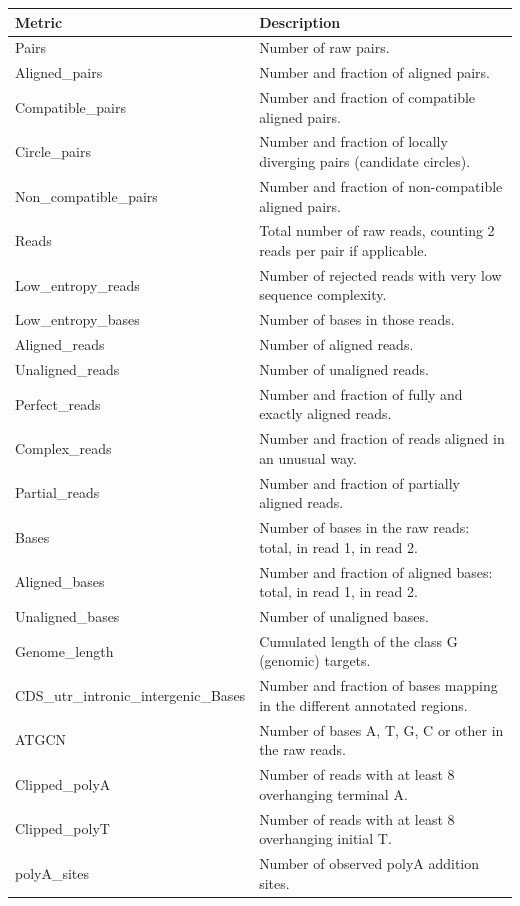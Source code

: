 \documentclass[11pt]{article}
\begin{document}
\begin{center}
\begin{longtable}{p{4.5cm} p{9cm}}
\toprule
\textbf{Metric} & \textbf{Description} \\
\midrule
\endhead
Pairs  & Number of raw pairs. \\
Aligned\_pairs & Number and fraction of aligned pairs. \\
Compatible\_pairs & Number and fraction of compatible aligned pairs. \\
Circle\_pairs & Number and fraction of locally diverging pairs (candidate circles). \\
Non\_compatible\_pairs  & Number and fraction of non-compatible aligned pairs. \\
Reads & Total number of raw reads, counting 2 reads per pair if applicable. \\
Low\_entropy\_reads & Number of rejected reads with very low sequence complexity. \\
Low\_entropy\_bases & Number of bases in those reads. \\
Aligned\_reads & Number of aligned reads. \\
Unaligned\_reads & Number of unaligned reads. \\
Perfect\_reads & Number and fraction of fully and exactly aligned reads. \\
Complex\_reads & Number and fraction of reads aligned in an unusual way. \\
Partial\_reads & Number and fraction of partially aligned reads. \\
Bases & Number of bases in the raw reads: total, in read 1, in read 2. \\
Aligned\_bases   & Number and fraction of aligned bases: total, in read 1, in read 2. \\
Unaligned\_bases  & Number of unaligned bases. \\
Genome\_length  & Cumulated length of the class G (genomic) targets. \\
CDS\_utr\_intronic\_intergenic\_Bases & Number and fraction of bases mapping in the different annotated regions. \\
ATGCN   & Number of bases A, T, G, C or other in the raw reads. \\
Clipped\_polyA & Number of reads with at least 8 overhanging terminal A. \\
Clipped\_polyT & Number of reads with at least 8 overhanging initial T. \\
polyA\_sites  & Number of observed polyA addition sites. \\

\end{longtable}
\end{center}
\end{document}
